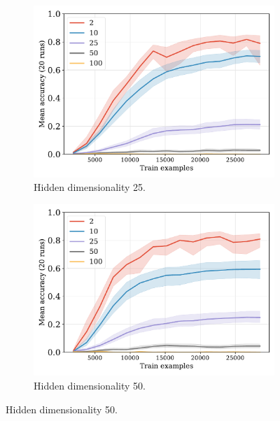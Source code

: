 \documentclass[12pt]{article}
\begin{document}
\begin{figure}[H]
  \begin{subfigure}{0.45\linewidth}
    \includegraphics[width=1\textwidth]{fig/fuzzy-lm-vocab20-train_size-embed_dim-hidden_dim=25.pdf}
    \caption{Hidden dimensionality 25.}
  \end{subfigure}
  \hfill
  \begin{subfigure}{0.45\linewidth}
    \includegraphics[width=1\textwidth]{fig/fuzzy-lm-vocab20-train_size-embed_dim-hidden_dim=50.pdf}
    \caption{Hidden dimensionality 50.}
  \end{subfigure}


\end{figure}
\end{document}
